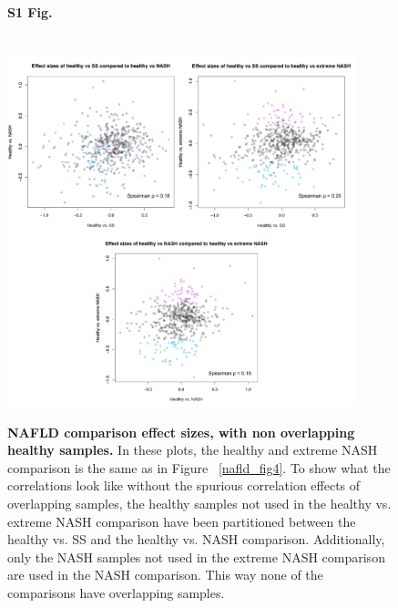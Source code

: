 \begin{figure}[h]
\paragraph*{S1 Fig.}{\mbox{}}\\
\includegraphics[width=0.9\textwidth]{nafld_16s_effect_sizes_partitioned_healthy.png}
\caption[NAFLD comparison effect sizes, with non overlapping healthy samples.]{{\bf {NAFLD comparison effect sizes, with non overlapping healthy samples.}} In these plots, the healthy and extreme NASH comparison is the same as in Figure ~\ref{nafld_fig4}. To show what the correlations look like without the spurious correlation effects of overlapping samples, the healthy samples not used in the healthy vs. extreme NASH comparison have been partitioned between the healthy vs. SS and the healthy vs. NASH comparison. Additionally, only the NASH samples not used in the extreme NASH comparison are used in the NASH comparison. This way none of the comparisons have overlapping samples.}
\label{nafld_non_overlapping_16s_effect}
\end{figure}


